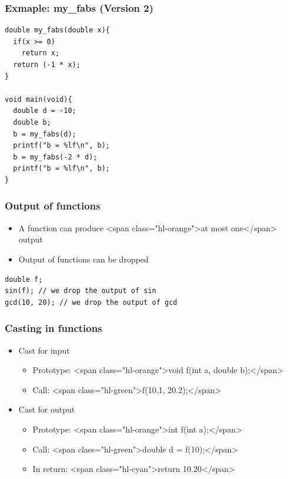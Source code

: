 \documentclass{../c-lecture}
\begin{document}
\begin{frame}[fragile]
  \frametitle{Exmaple: my\_fabs (Version 2)}
  \begin{verbatim}
double my_fabs(double x){
  if(x >= 0)
    return x;
  return (-1 * x);
}

void main(void){
  double d = -10;
  double b;
  b = my_fabs(d);
  printf("b = %lf\n", b);
  b = my_fabs(-2 * d);
  printf("b = %lf\n", b);
}
  \end{verbatim}
\end{frame}

\begin{frame}[fragile]
  \frametitle{Output of functions}
  \begin{itemize}
    \item
      A function can produce
      <span class="hl-orange">at most one</span> output

    \item Output of functions can be dropped
  \end{itemize}
  \begin{verbatim}
double f;
sin(f); // we drop the output of sin
gcd(10, 20); // we drop the output of gcd
  \end{verbatim}
\end{frame}

\begin{frame}[fragile]
  \frametitle{Casting in functions}
  \begin{itemize}
    \item Cast for input
    \begin{itemize}
      \item
        Prototype: <span class="hl-orange">void f(int a, double b);</span>

      \item Call: <span class="hl-green">f(10.1, 20.2);</span>
    \end{itemize}
    \item Cast for output
    \begin{itemize}
      \item Prototype: <span class="hl-orange">int f(int a);</span>
      \item Call: <span class="hl-green">double d = f(10);</span>
      \item In return: <span class="hl-cyan">return 10.20</span>
    \end{itemize}
  \end{itemize}
\end{frame}
\end{document}

